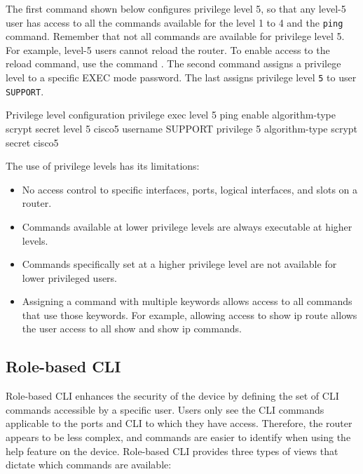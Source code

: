 The first command shown below configures privilege level 5, so that any level-5 user has access to all the commands available for the level 1 to 4 and the \texttt{ping} command. Remember that not all commands are available for privilege level 5. For example, level-5 users cannot reload the router. To enable access to the reload command, use the command . The second command assigns a privilege level to a specific EXEC mode password. The last assigns privilege level \texttt{5} to user \texttt{SUPPORT}. 

\begin{sexylisting}{Privilege level configuration}
privilege exec level 5 ping 
enable algorithm-type scrypt secret level 5 cisco5
username SUPPORT privilege 5 algorithm-type scrypt secret cisco5
\end{sexylisting}

The use of privilege levels has its limitations:

\begin{itemize}
\item No access control to specific interfaces, ports, logical interfaces, and slots on a router.
\item Commands available at lower privilege levels are always executable at higher levels.
\item Commands specifically set at a higher privilege level are not available for lower privileged users.
\item Assigning a command with multiple keywords allows access to all commands that use those keywords. For example, allowing access to show ip route allows the user access to all show and show ip commands.
\end{itemize}

\subsection{Role-based CLI}

Role-based CLI enhances the security of the device by defining the set of CLI commands accessible by a specific user. Users only see the CLI commands applicable to the ports and CLI to which they have access. Therefore, the router appears to be less complex, and commands are easier to identify when using the help feature on the device. Role-based CLI provides three types of views that dictate which commands are available:

